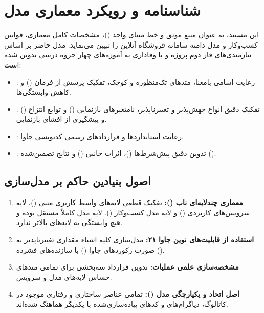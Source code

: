 \documentclass[11pt,a4paper]{article}
\begin{document}
\newpage
\tableofcontents
\newpage

\section{شناسنامه و رویکرد معماری مدل }

این مستند، به عنوان منبع موثق و خط مبنای واحد ()، مشخصات کامل معماری، قوانین کسب‌وکار و مدل دامنه سامانه فروشگاه آنلاین را تبیین می‌نماید. مدل حاضر بر اساس نیازمندی‌های فاز دوم پروژه و با وفاداری به آموزه‌های چهار جزوه درسی تدوین شده است:
\begin{itemize}[leftmargin=1.5cm]
    \item {}: رعایت اسامی بامعنا، متدهای تک‌منظوره و کوچک، تفکیک پرسش از فرمان () و کاهش وابستگی‌ها.
    \item {}: تفکیک دقیق انواع جهش‌پذیر و تغییرناپذیر، نامتغیرهای بازنمایی () و توابع انتزاع () و پیشگیری از افشای بازنمایی.
    \item {}: رعایت استانداردها و قراردادهای رسمی کدنویسی جاوا.
    \item {}: تدوین دقیق پیش‌شرط‌ها ()، اثرات جانبی () و نتایج تضمین‌شده ().
\end{itemize}

\subsection{اصول بنیادین حاکم بر مدل‌سازی}
\begin{enumerate}
    \item \textbf{معماری چندلایه‌ای ناب ():} تفکیک قطعی لایه‌های واسط کاربری متنی ()، لایه سرویس‌های کاربردی () و لایه مدل کسب‌وکار (). لایه مدل کاملاً مستقل بوده و هیچ وابستگی به لایه‌های بالاتر ندارد.
    \item \textbf{استفاده از قابلیت‌های نوین جاوا ۲۱:} مدل‌سازی کلیه اشیاء مقداری تغییرناپذیر به صورت رکوردهای جاوا () با سازنده‌های فشرده ().
    \item \textbf{مشخصه‌سازی علمی عملیات:} تدوین قرارداد سه‌بخشی  برای تمامی متدهای حساس لایه‌های مدل و سرویس.
    \item \textbf{اصل اتحاد و یکپارچگی مدل ():} تمامی عناصر ساختاری و رفتاری موجود در کاتالوگ، دیاگرام‌های  و کدهای پیاده‌سازی‌شده با یکدیگر هماهنگ شده‌اند.
\end{enumerate}
\end{document}
